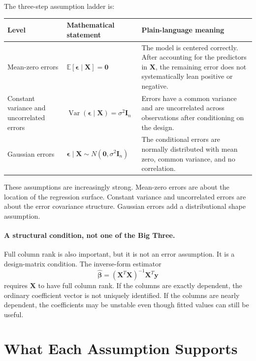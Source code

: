 The three-step assumption ladder is:
\begin{center}
\begin{tabular}{>{\raggedright\arraybackslash}p{}>{\raggedright\arraybackslash}p{}>{\raggedright\arraybackslash}p{}}
\toprule
\textbf{Level} & \textbf{Mathematical statement} & \textbf{Plain-language meaning} \\
\midrule
Mean-zero errors & \(\mathbb{E}[\boldsymbol{\epsilon}\mid \mathbf{X}]=\mathbf{0}\) & The model is centered correctly.  After accounting for the predictors in \(\mathbf{X}\), the remaining error does not systematically lean positive or negative. \\
Constant variance and uncorrelated errors & \(\operatorname{Var}(\boldsymbol{\epsilon}\mid \mathbf{X})=\sigma^2\mathbf{I}_n\) & Errors have a common variance and are uncorrelated across observations after conditioning on the design. \\
Gaussian errors & \(\boldsymbol{\epsilon}\mid \mathbf{X}\sim N(\mathbf{0},\sigma^2\mathbf{I}_n)\) & The conditional errors are normally distributed with mean zero, common variance, and no correlation. \\
\bottomrule
\end{tabular}
\end{center}

These assumptions are increasingly strong.  Mean-zero errors are about the location of the regression surface.  Constant variance and uncorrelated errors are about the error covariance structure.  Gaussian errors add a distributional shape assumption.

\paragraph{A structural condition, not one of the Big Three.}
Full column rank is also important, but it is not an error assumption.  It is a design-matrix condition.  The inverse-form estimator
\begin{equation}
  \widehat{\boldsymbol{\beta}}
  = (\mathbf{X}^T\mathbf{X})^{-1}\mathbf{X}^T\mathbf{y}
\end{equation}
requires \(\mathbf{X}\) to have full column rank.  If the columns are exactly dependent, the ordinary coefficient vector is not uniquely identified.  If the columns are nearly dependent, the coefficients may be unstable even though fitted values can still be useful.

\section{What Each Assumption Supports}

